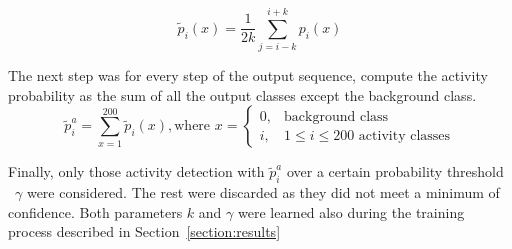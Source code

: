 \begin{equation}
	\tilde{p}_i(x) = \frac{1}{2k} \sum_{j=i-k}^{i+k} p_i(x)
    \label{eq:mean_filter}
\end{equation}

The next step was for every step of the output sequence, compute the activity probability as the sum of all the output classes except the background class.
\begin{equation}
	\tilde{p}^a_i = \sum_{x=1}^{200}\tilde{p}_i(x), \text{where } x = \begin{cases}
        0, & \text{background class} \\
        i, & 1 \leq i \leq 200 \text{ activity classes}
    \end{cases}
\end{equation}


Finally, only those activity detection with $\tilde{p}^a_i$ over a certain probability threshold ~$\gamma$ were considered. The rest were discarded as they did not meet a minimum of confidence. Both parameters $k$ and $\gamma$ were learned also during the training process described in Section~\ref{section:results}

